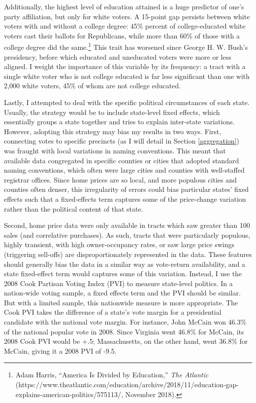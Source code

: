 \documentclass[12pt,oneside]{psthesis}
\begin{document}
Additionally, the highest level of education attained is a huge predictor of one's party affiliation, but only for white voters.
A 15-point gap persists between white voters with and without a college degree: 45\% percent of college-educated white voters cast their ballots for Republicans, while more than 60\% of those with a college degree did the same.\footnote{Adam Harris, ``America Is Divided by Education,'' \emph{The Atlantic} (https://www.theatlantic.com/education/archive/2018/11/education-gap-explains-american-politics/575113/, November 2018).}
This trait has worsened since George H. W. Bush's presidency, before which educated and uneducated voters were more or less aligned.
I weight the importance of this variable by its frequency: a tract with a single white voter who is not college educated is far less significant than one with 2,000 white voters, 45\% of whom are not college educated.

Lastly, I attempted to deal with the specific political circumstances of each state.
Usually, the strategy would be to include state-level fixed effects, which essentially groups a state together and tries to explain inter-state variations.
However, adopting this strategy may bias my results in two ways.
First, connecting votes to specific precincts (as I will detail in Section \ref{aggregation}) was fraught with local variations in naming conventions.
This meant that available data congregated in specific counties or cities that adopted standard naming conventions, which often were large cities and counties with well-staffed registrar offices.
Since home prices are so local, and more populous cities and counties often denser, this irregularity of errors could bias particular states' fixed effects such that a fixed-effects term captures some of the price-change variation rather than the political content of that state.

Second, home price data were only available in tracts which saw greater than 100 sales (and correlative purchases).
As such, tracts that were particularly populous, highly transient, with high owner-occupancy rates, or saw large price swings (triggering sell-offs) are disproportionately represented in the data.
These features should generally bias the data in a similar way as vote-return availability, and a state fixed-effect term would captures some of this variation.
Instead, I use the 2008 Cook Partisan Voting Index (PVI) to measure state-level politics.
In a nation-wide voting sample, a fixed effects term and the PVI should be similar.
But with a limited sample, this nationwide measure is more appropriate.
The Cook PVI takes the difference of a state's vote margin for a presidential candidate with the national vote margin.
For instance, John McCain won 46.3\% of the national popular vote in 2008.
Since Virginia went 46.8\% for McCain, its 2008 Cook PVI would be +.5; Massachusetts, on the other hand, went 36.8\% for McCain, giving it a 2008 PVI of -9.5.
\end{document}
